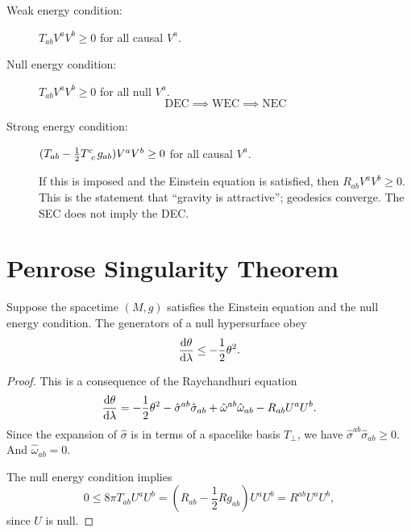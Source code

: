 


\begin{description}
  \item[Weak energy condition:] $T_{ab} V^{a} V^{b} \geq 0$ for all causal $V^a$.
  \item[Null energy condition:] $T_{ab} V^{a} V^{b} \geq 0$ for all null $V^a$.
    \begin{equation}
      \text{DEC} \implies \text{WEC} \implies \text{NEC}
    \end{equation}
  \item[Strong energy condition:] $(T_{ab} - \frac{1}{2} T\indices{^{c}_{c}} g_{ab}) V^{a} V^{b} \geq 0$ for all causal $V^a$.

    If this is imposed and the Einstein equation is satisfied, then $ R_{ab} V^{a} V^{b} \geq 0$.
    This is the statement that ``gravity is attractive''; geodesics converge.
    The SEC does not imply the DEC.
\end{description}

\section{Penrose Singularity Theorem}%
\label{sec:penrose_singularity_theorem}

\begin{lemma}
  Suppose the spacetime $(M, g)$  satisfies the Einstein equation and the null energy condition. 
  The generators of a null hypersurface obey
  \begin{equation}
    \label{eq:11-star}
    \dv{\theta}{\lambda} \leq -\frac{1}{2} \theta^2.
  \end{equation}
\end{lemma}
\begin{proof}
  This is a consequence of the Raychandhuri equation
  \begin{equation}
    \dv{\theta}{\lambda} = -\frac{1}{2} \theta^2 - \hat{\sigma}^{ab} \hat{\sigma}_{ab} + \hat{\omega}^{ab} \hat{\omega}_{ab} - R_{ab} U^{a} U^{b}.
  \end{equation}
  Since the expansion of $\hat{\sigma}$ is in terms of a spacelike basis $T_\perp$, we have $\hat{\sigma}^{ab} \hat{\sigma}_{ab} \geq 0$.
  And $\hat{\omega}_{ab} = 0$.

  The null energy condition implies
  \begin{equation}
    0 \leq 8 \pi T_{ab} U^a U^b = (R_{ab} - \frac{1}{2} R g_{ab}) U^{a} U^{b} = R^{ab} U^{a} U^{b},
  \end{equation}
  since $U$ is null.
\end{proof}

